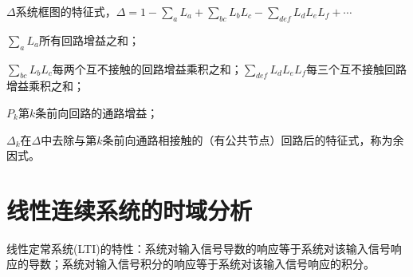 \documentclass[11pt,a4paper]{ctexart}
\begin{document}
            $\Delta$系统框图的特征式，$\Delta=1-\sum\limits_aL_a+\sum\limits_{bc}L_bL_c-\sum\limits_{def}L_dL_eL_f+\cdots$

            $\sum\limits_aL_a$所有回路增益之和；
            
            $\sum\limits_{bc}L_bL_c$每两个互不接触的回路增益乘积之和；$\sum\limits_{def}L_dL_eL_f$每三个互不接触回路增益乘积之和；

            $P_k$第$k$条前向回路的通路增益；

            $\Delta_k$在$\Delta$中去除与第$k$条前向通路相接触的（有公共节点）回路后的特征式，称为余因式。
\newpage
\section{线性连续系统的时域分析}
    \begin{table}[H]
        \centering
        \caption{典型输入信号}
    \end{table}

    线性定常系统(LTI)的特性：系统对输入信号导数的响应等于系统对该输入信号响应的导数；系统对输入信号积分的响应等于系统对该输入信号响应的积分。
\end{document}
